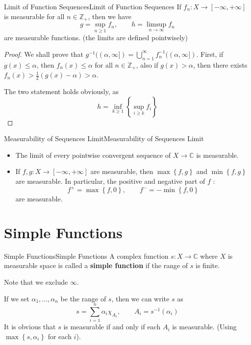\documentclass[../main.tex]{subfiles}
\begin{document}
\begin{theorem}{Limit of Function Sequences}{Limit of Function Sequences}
	If $f_n: X \rightarrow [-\infty ,+\infty ]$ is measurable for all $n\in \mathbb{Z}_+$, then we have
	\begin{equation*}
		g = \sup_{n \geq 1} f_n, \qquad h = \limsup_{n\rightarrow \infty } f_n
	\end{equation*}
	are measurable functions. (the limits are defined pointwisely)
\end{theorem}
\begin{proof}
	We shall prove that $g^{-1}((\alpha,\infty ]) = \bigcup_{n=1}^{\infty } f_n^{-1}((\alpha, \infty ])$. First, if $g(x) \leq \alpha$, then $f_n(x) \leq \alpha$ for all $n\in \mathbb{Z}_+$, also if $g(x) > \alpha$, then there exists $f_n(x) > \frac{1}{2}(g(x) - \alpha) > \alpha$.

	The two statement holds obviously, as
	\begin{equation*}
	h = \inf_{k \geq 1} \left\{ \sup_{i\geq k}f_i \right\}
	\end{equation*}
\end{proof}

\begin{corollary}{Measurability of Sequences Limit}{Measurability of Sequences Limit}
\begin{itemize}
\item The limit of every pointwise convergent sequence of $X \rightarrow \mathbb{C}$ is measurable.
\item If $f,g: X \rightarrow [-\infty ,+\infty ]$ are measurable, then $\max \left\{ f,g \right\}$ and $\min \left\{ f,g \right\}$ are measurable. In particular, the positive and negative part of $f$ :
	\begin{equation*}
		f^+ = \max \left\{ f,0 \right\}, \qquad f^- = -\min \left\{ f,0 \right\}
	\end{equation*}
	are measurable.
\end{itemize}
\end{corollary}

\section{Simple Functions}
\begin{definition}{Simple Functions}{Simple Functions}
	A complex function $s: X \rightarrow \mathbb{C}$ where $X$ is measurable space is called a \textbf{simple function} if the range of $s$ is finite.

	Note that we exclude $\infty $.
\end{definition}
If we set $\alpha_1, \ldots ,\alpha_n$ be the range of $s$, then we can write $s$ as
\begin{equation}
	s = \sum_{i=1}^{n} \alpha_i \chi_{A_i}, \qquad A_i = s^{-1}(\alpha_i)
\end{equation}
It is obvious that $s$ is measurable if and only if each $A_i$ is measurable. (Using $\max \left\{ s,\alpha_i \right\}$ for each $i$).
\end{document}
